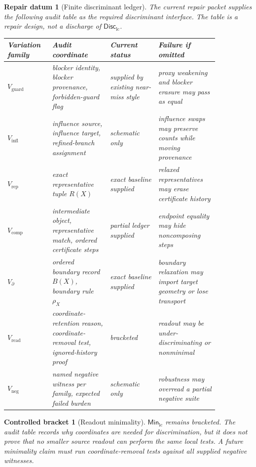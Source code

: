 \documentclass[11pt]{article}
\newcommand{\MinLC}{\mathsf{Min}_{\mathrm{lc}}}
\newcommand{\DiscLC}{\mathsf{Disc}_{\mathrm{lc}}}
\newtheorem{repair}{Repair datum}
\newtheorem{bracket}{Controlled bracket}
\begin{document}
\begin{repair}[Finite discriminant ledger]
The current repair packet supplies the following audit table as the
required discriminant interface. The table is a repair design, not a
discharge of \(\DiscLC\).

\begin{center}
\small
\begin{tabular}{p{0.16\linewidth}p{0.24\linewidth}p{0.20\linewidth}p{0.25\linewidth}}
\hline
Variation family & Audit coordinate & Current status & Failure if omitted \\
\hline
\(V_{\mathrm{guard}}\) & blocker identity, blocker provenance, forbidden-guard flag & supplied by existing near-miss style & proxy weakening and blocker erasure may pass as equal \\
\(V_{\mathrm{infl}}\) & influence source, influence target, refined-branch assignment & schematic only & influence swaps may preserve counts while moving provenance \\
\(V_{\mathrm{rep}}\) & exact representative tuple \(R(X)\) & exact baseline supplied & relaxed representatives may erase certificate history \\
\(V_{\mathrm{comp}}\) & intermediate object, representative match, ordered certificate steps & partial ledger supplied & endpoint equality may hide noncomposing steps \\
\(V_{\partial}\) & ordered boundary record \(B(X)\), boundary rule \(\rho_X\) & exact baseline supplied & boundary relaxation may import target geometry or lose transport \\
\(V_{\mathrm{read}}\) & coordinate-retention reason, coordinate-removal test, ignored-history proof & bracketed & readout may be under-discriminating or nonminimal \\
\(V_{\mathrm{neg}}\) & named negative witness per family, expected failed burden & schematic only & robustness may overread a partial negative suite \\
\hline
\end{tabular}
\end{center}
\end{repair}

\begin{bracket}[Readout minimality]
\(\MinLC\) remains bracketed. The audit table records why coordinates
are needed for discrimination, but it does not prove that no smaller
source readout can perform the same local tests. A future minimality
claim must run coordinate-removal tests against all supplied negative
witnesses.
\end{bracket}
\end{document}

